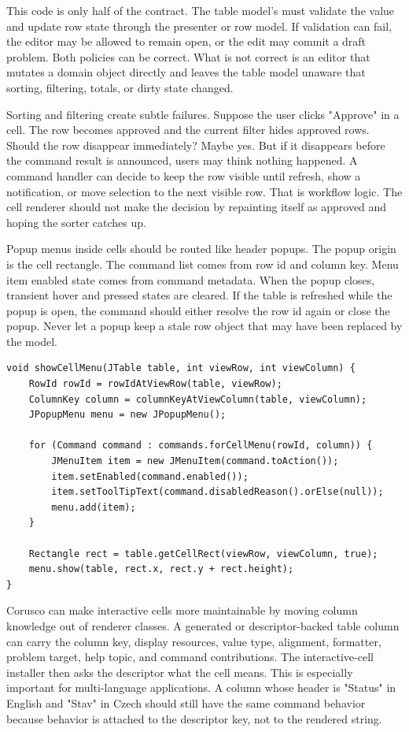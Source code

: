 This code is only half of the contract. The table model's 
must validate the value and update row state through the presenter or row model.
If validation can fail, the editor may be allowed to remain open, or the edit may
commit a draft problem. Both policies can be correct. What is not correct is an
editor that mutates a domain object directly and leaves the table model unaware
that sorting, filtering, totals, or dirty state changed.

Sorting and filtering create subtle failures. Suppose the user clicks "Approve"
in a cell. The row becomes approved and the current filter hides approved rows.
Should the row disappear immediately? Maybe yes. But if it disappears before the
command result is announced, users may think nothing happened. A command handler
can decide to keep the row visible until refresh, show a notification, or move
selection to the next visible row. That is workflow logic. The cell renderer
should not make the decision by repainting itself as approved and hoping the
sorter catches up.

Popup menus inside cells should be routed like header popups. The popup origin is
the cell rectangle. The command list comes from row id and column key. Menu item
enabled state comes from command metadata. When the popup closes, transient
hover and pressed states are cleared. If the table is refreshed while the popup
is open, the command should either resolve the row id again or close the popup.
Never let a popup keep a stale row object that may have been replaced by the
model.

\begin{lstlisting}[caption={A row command popup is built from row id and column key.}]
void showCellMenu(JTable table, int viewRow, int viewColumn) {
    RowId rowId = rowIdAtViewRow(table, viewRow);
    ColumnKey column = columnKeyAtViewColumn(table, viewColumn);
    JPopupMenu menu = new JPopupMenu();

    for (Command command : commands.forCellMenu(rowId, column)) {
        JMenuItem item = new JMenuItem(command.toAction());
        item.setEnabled(command.enabled());
        item.setToolTipText(command.disabledReason().orElse(null));
        menu.add(item);
    }

    Rectangle rect = table.getCellRect(viewRow, viewColumn, true);
    menu.show(table, rect.x, rect.y + rect.height);
}
\end{lstlisting}

Corusco can make interactive cells more maintainable by moving column knowledge
out of renderer classes. A generated or descriptor-backed table column can carry
the column key, display resources, value type, alignment, formatter, problem
target, help topic, and command contributions. The interactive-cell installer
then asks the descriptor what the cell means. This is especially important for
multi-language applications. A column whose header is "Status" in English and
"Stav" in Czech should still have the same command behavior because behavior is
attached to the descriptor key, not to the rendered string.

